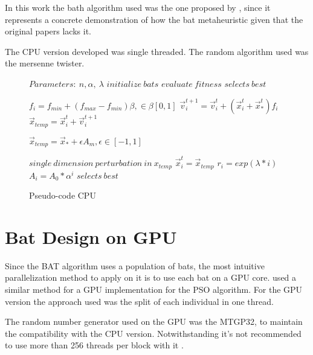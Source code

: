 \documentclass[conference]{IEEEtran}
\begin{document}
In this work the bath algorithm used was the one proposed by
\cite{parpinelli}, since it represents a concrete demonstration of how
the bat metaheuristic given that the original papers lacks it.

The CPU version developed was single threaded.
The random algorithm used was the mersenne twister.

\begin{figure}
\begin{algorithmic}[1]
\State $Parameters:\ n,\alpha,\ \lambda$
\State $initialize\ bats$
\State $evaluate\ fitness$
\State $selects\ best$

        \State $f_i=f_{min} + (f_{max} - f_{min})\beta, \in \beta [0,1]$
        \State $\vec{v}_i^{t+1} = \vec{v}_i^{t} + (\vec{x}_i^{t} + \vec{x}_*^{t})f_i$
        \State $\vec{x}_{temp} = \vec{x}_i^{t} + \vec{v}_i^{t+1}$


            \State $\vec{x}_{temp} = \vec{x}_* + \epsilon A_m, \epsilon \in [-1, 1]$
        \EndIf

        \State $single\ dimension\ perturbation\ in\ x_{temp}$
            \State $\vec{x}_i^t = \vec{x}_{temp}$
            \State $r_i = exp(\lambda * i)$
            \State $A_i =  A_{0} * \alpha^i$
        \EndIf
        \State $selects\ best$
    \EndFor
\EndWhile
\end{algorithmic}
\caption{Pseudo-code CPU}\label{GPU}
\end{figure}


\section{Bat Design on GPU}

Since the BAT algorithm uses a population of bats, the most intuitive
parallelization method to apply on it is to use each bat on a GPU core.
\cite{pso-gpu} used a similar method for a GPU implementation for the PSO algorithm.
For the GPU version the approach used was the split of each individual in one thread.

The random number generator used on the GPU was the MTGP32, to
maintain the compatibility with the CPU version. Notwithstanding it's
not recommended to use more than 256 threads per block with it
\cite{curandIssue}.
\end{document}

